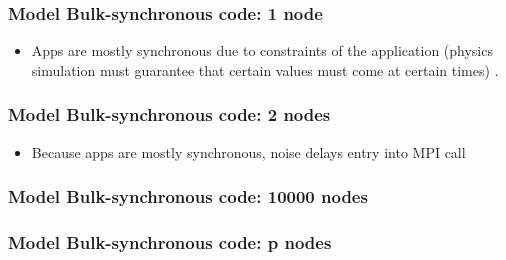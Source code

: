 %


%

\begin{frame}
\frametitle{Model Bulk-synchronous code: 1 node}
\begin{itemize}
\item \tiny Apps are mostly synchronous due to constraints of the application (physics simulation  must guarantee that certain values must come at certain times) .
\end{itemize}
\end{frame}


\begin{frame}
\frametitle{Model Bulk-synchronous code: 2 nodes}
\begin{itemize}
\item \tiny Because apps are mostly synchronous, noise delays entry into MPI call
\end{itemize}
\end{frame}


\begin{frame}
\frametitle{Model Bulk-synchronous code: 10000 nodes}
\end{frame}


\begin{frame}
\frametitle{Model Bulk-synchronous code: p nodes}
\end{frame}


